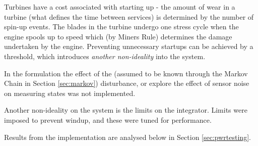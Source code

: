 Turbines have a cost associated with starting up - the amount of wear in a turbine (what defines the time between services) is determined by the number of spin-up events.
The blades in the turbine undergo one stress cycle when the engine spools up to speed which (by Miners Rule) determines the damage undertaken by the engine.
Preventing unnecessary startups can be achieved by a threshold, which introduces \emph{another non-ideality} into the system.

In the formulation the effect of the (assumed to be known through the Markov Chain in Section \ref{sec:markov}) disturbance, or explore the effect of sensor noise on measuring states was not implemented.

Another non-ideality on the system is the limits on the integrator.
Limits were imposed to prevent windup, and these were tuned for performance.

Results from the implementation are analysed below in Section \ref{sec:pwrtesting}.
